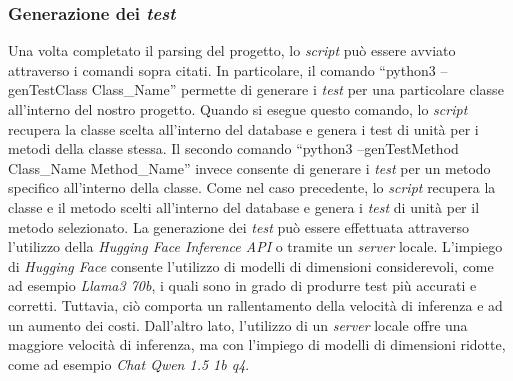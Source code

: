     \subsubsection{Generazione dei \textit{test}}
    Una volta completato il parsing del progetto, lo \textit{script} può essere avviato attraverso i comandi sopra citati.
    In particolare, il comando “python3 --genTestClass Class\_Name” permette di generare i \textit{test} per una particolare classe all'interno del nostro progetto.
    Quando si esegue questo comando, lo \textit{script} recupera la classe scelta all'interno del database e genera i test di unità per i metodi della classe stessa.
    Il secondo comando “python3 --genTestMethod Class\_Name Method\_Name” invece consente di generare i \textit{test} per un metodo specifico all'interno della classe.
    Come nel caso precedente, lo \textit{script} recupera la classe e il metodo scelti all'interno del database e genera i \textit{test} di unità per il metodo selezionato.
    La generazione dei \textit{test} può essere effettuata attraverso l'utilizzo della \textit{Hugging Face Inference API} o tramite un \textit{server} locale. 
    L'impiego di \textit{Hugging Face} consente l'utilizzo di modelli di dimensioni considerevoli, come ad esempio \textit{Llama3 70b}, i quali sono in grado di produrre test più accurati e corretti. Tuttavia, ciò comporta un rallentamento della velocità di inferenza e ad un aumento dei costi. 
    Dall'altro lato, l'utilizzo di un \textit{server} locale offre una maggiore velocità di inferenza, ma con l'impiego di modelli di dimensioni ridotte, come ad esempio \textit{Chat Qwen 1.5 1b q4}.

